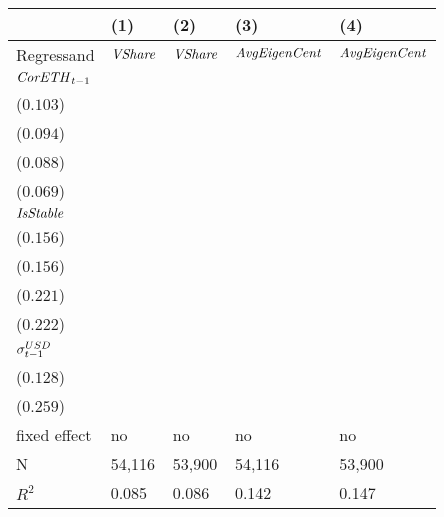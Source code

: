 \begin{tabular}{lllll}
\toprule
{} &                                    (1) &                                    (2) &                                    (3) &                                    (4) \\
\midrule
Regressand                 &                         ${\it VShare}$ &                         ${\it VShare}$ &                   ${\it AvgEigenCent}$ &                   ${\it AvgEigenCent}$ \\
${\it CorETH}_{t-1}$       &  \makecell{$0.036^{***}$ \\ ($0.103$)} &  \makecell{$0.033^{***}$ \\ ($0.094$)} &  \makecell{$0.058^{***}$ \\ ($0.088$)} &  \makecell{$0.045^{***}$ \\ ($0.069$)} \\
${\it IsStable}$           &  \makecell{$0.048^{***}$ \\ ($0.156$)} &  \makecell{$0.048^{***}$ \\ ($0.156$)} &  \makecell{$0.125^{***}$ \\ ($0.221$)} &  \makecell{$0.126^{***}$ \\ ($0.222$)} \\
${\it \sigma}^{USD}_{t-1}$ &                            \makecell{} &  \makecell{$0.021^{***}$ \\ ($0.128$)} &                            \makecell{} &  \makecell{$0.077^{***}$ \\ ($0.259$)} \\
\midrule fixed effect      &                                     no &                                     no &                                     no &                                     no \\
N                          &                                 54,116 &                                 53,900 &                                 54,116 &                                 53,900 \\
$R^2$                      &                                  0.085 &                                  0.086 &                                  0.142 &                                  0.147 \\
\bottomrule
\end{tabular}
